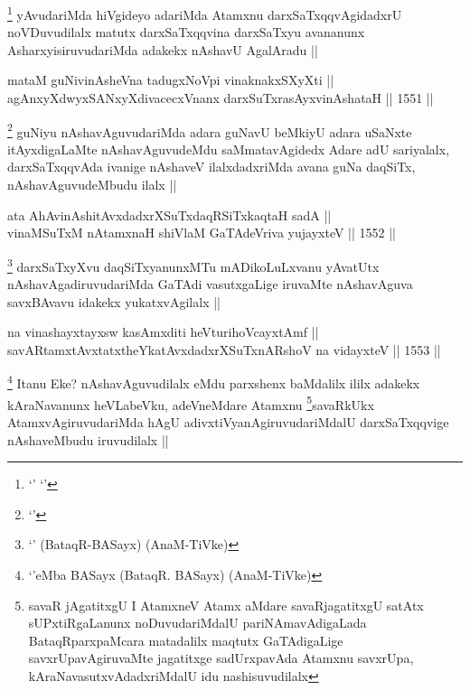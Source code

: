 \begin{artha}
\footnote{`\stext' `\stext'}
yAvudariMda hiVgideyo adariMda Atamxnu darxSaTxqqvAgidadxrU noVDuvudilalx matutx darxSaTxqqvina darxSaTxyu avananunx AsharxyisiruvudariMda adakekx nAshavU AgalAradu ||
\end{artha}


\begin{shl}
mataM guNivinAsheVna tadugxNoV\s pi vinaknakxSXyXti || \\
agAnxyXdwyxSANxyXdivacecxVnanx darxSuTxrasAyxvinAshataH ||  1551 ||  
\end{shl}

\begin{artha}
\footnote{`\stext'}
guNiyu nAshavAguvudariMda adara guNavU beMkiyU adara uSaNxte itAyxdigaLaMte nAshavAguvudeMdu saMmatavAgidedx Adare adU sariyalalx, darxSaTxqqvAda ivanige nAshaveV ilalxdadxriMda avana guNa daqSiTx, nAshavAguvudeMbudu ilalx ||
\end{artha}



\begin{shl}
ata AhAvinAshitAvxdadxrXSuTxdaqRSiTxkaqtaH sadA ||  \\
vinaMSuTxM nA\s \s tamxnaH shiVlaM GaTAdeVriva yujayxteV ||  1552 ||  
\end{shl}

\begin{artha}
\footnote{`\stext' (BataqR-BASayx) (AnaM-TiVke)}
darxSaTxyXvu daqSiTxyanunxMTu mADikoLuLxvanu yAvatUtx nAshavAgadiruvudariMda GaTAdi vasutxgaLige iruvaMte nAshavAguva savxBAvavu idakekx yukatxvAgilalx ||
\end{artha}

\begin{shl}
na vinashayxtayxsw kasAmxditi heVturihoVcayxtAmf || \\
savARtamxtAvxtatxtheYkatAvxdadxrXSuTxnARshoV na vidayxteV ||  1553 ||  
\end{shl}

\begin{artha}
\footnote{`\stext'eMba BASayx (BataqR. BASayx) (AnaM-TiVke)}
Itanu Eke? nAshavAguvudilalx eMdu parxshenx baMdalilx ililx adakekx kAraNavanunx heVLabeVku, adeVneMdare Atamxnu \footnote{savaR jAgatitxgU I AtamxneV Atamx aMdare savaRjagatitxgU satAtx sUPxtiRgaLanunx noDuvudariMdalU pariNAmavAdigaLada BataqRparxpaMcara matadalilx maqtutx GaTAdigaLige savxrUpavAgiruvaMte jagatitxge sadUrxpavAda Atamxnu savxrUpa, kAraNavasutxvAdadxriMdalU idu nashisuvudilalx}savaRkUkx AtamxvAgiruvudariMda hAgU adivxtiVyanAgiruvudariMdalU darxSaTxqqvige nAshaveMbudu iruvudilalx ||
\end{artha}

